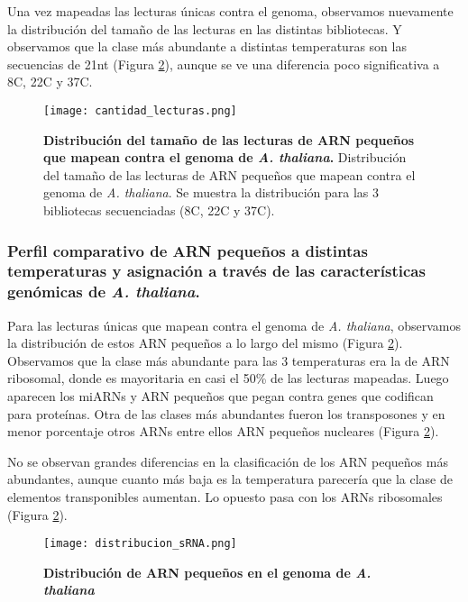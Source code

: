 Una vez mapeadas las lecturas únicas contra el genoma, observamos nuevamente la distribución del tamaño de las lecturas en las distintas bibliotecas.
Y observamos que la clase más abundante a distintas temperaturas son las secuencias de 21nt (Figura \ref{fig:distribucion_sRNA}), aunque se ve una diferencia poco significativa a 8\degree C, 22\degree C y 37\degree C.

\begin{figure}[htbp!] 
    \centering    
    \texttt{[image: cantidad\_lecturas.png]}
    \caption[Distribución del tamaño de las lecturas de ARN pequeños que mapean contra el genoma de \textit{A. thaliana}]{
    \textbf{Distribución del tamaño de las lecturas de ARN pequeños que mapean contra el genoma de \textit{A. thaliana}.}
    Distribución del tamaño de las lecturas de ARN pequeños que mapean contra el genoma de \textit{A. thaliana}.
    Se muestra la distribución para las 3 bibliotecas secuenciadas (8\degree C, 22\degree C y 37\degree C).
   }
     \label{fig:cantidad_lecturas}
\end{figure}


\subsubsection{Perfil comparativo de ARN pequeños a distintas temperaturas y asignación a través de las características genómicas de \textit{A. thaliana}.}

Para las lecturas únicas que mapean contra el genoma de \textit{A. thaliana}, observamos la distribución de estos ARN pequeños a lo largo del mismo (Figura \ref{fig:distribucion_sRNA}).
Observamos que la clase más abundante para las 3 temperaturas era la de ARN ribosomal, donde es mayoritaria en casi el 50\% de las lecturas mapeadas.
Luego aparecen los miARNs y ARN pequeños que pegan contra genes que codifican para proteínas.
Otra de las clases más abundantes fueron los transposones y en menor porcentaje otros ARNs entre ellos ARN pequeños nucleares (Figura \ref{fig:distribucion_sRNA}).

No se observan grandes diferencias en la clasificación de los ARN pequeños más abundantes, aunque cuanto más baja es la temperatura parecería que la clase de elementos transponibles aumentan.
Lo opuesto pasa con los ARNs ribosomales (Figura \ref{fig:distribucion_sRNA}).

\begin{figure}[htbp!] 
    \centering    
    \texttt{[image: distribucion\_sRNA.png]}
    \caption[Distribución de ARN pequeños en el genoma de \textit{A. thaliana}]{
    \textbf{Distribución de ARN pequeños en el genoma de \textit{A. thaliana}}
        }
     \label{fig:distribucion_sRNA}
\end{figure}

